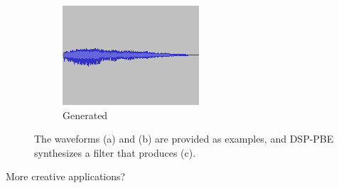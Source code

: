 \begin{figure}
\begin{subfigure}{.32\linewidth}
  \includegraphics[width=.9\textwidth]{figs/lpf950.png}
  \caption{Generated}
  \label{fig:synthEx}
\end{subfigure}
\caption{The waveforms (a) and (b) are provided as examples, and DSP-PBE synthesizes a filter that produces (c).}
\label{fig:test}
\end{figure}

More creative applications?
